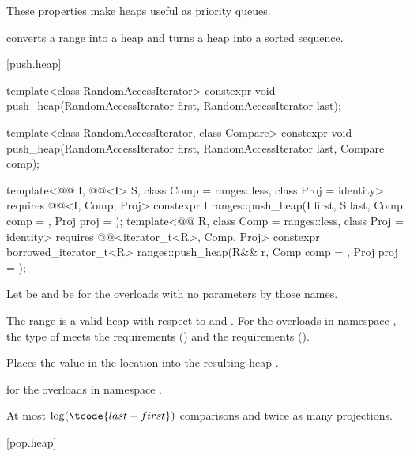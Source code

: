\pnum
These properties make heaps useful as priority queues.

\pnum
{} converts a range into a heap and
 turns a heap into a sorted sequence.

[push.heap]{}

%
\begin{itemdecl}
template<class RandomAccessIterator>
  constexpr void push_heap(RandomAccessIterator first, RandomAccessIterator last);

template<class RandomAccessIterator, class Compare>
  constexpr void push_heap(RandomAccessIterator first, RandomAccessIterator last,
                           Compare comp);

template<@@ I, @@<I> S, class Comp = ranges::less,
         class Proj = identity>
  requires @@<I, Comp, Proj>
  constexpr I
    ranges::push_heap(I first, S last, Comp comp = {}, Proj proj = {});
template<@@ R, class Comp = ranges::less, class Proj = identity>
  requires @@<iterator_t<R>, Comp, Proj>
  constexpr borrowed_iterator_t<R>
    ranges::push_heap(R&& r, Comp comp = {}, Proj proj = {});
\end{itemdecl}

\begin{itemdescr}
\pnum
Let  be 
and  be 
for the overloads with no parameters by those names.

\pnum
\expects
The range 
is a valid heap with respect to  and .
For the overloads in namespace ,
the type of  meets
the  requirements () and
the  requirements ().

\pnum
\effects
Places the value in the location 
into the resulting heap .

\pnum
\returns
{} for the overloads in namespace .

\pnum
\complexity
At most $\log(\tcode{last - first})$ comparisons and twice as many projections.
\end{itemdescr}

[pop.heap]{}

